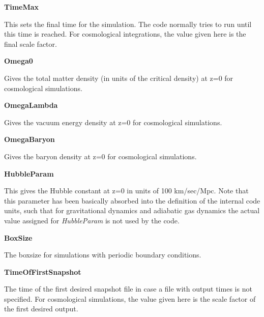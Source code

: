 \begin{DoxyItemize}
\item {\bfseries TimeMax} \par
 This sets the final time for the simulation. The code normally tries to run until this time is reached. For cosmological integrations, the value given here is the final scale factor.
\end{DoxyItemize}


\begin{DoxyItemize}
\item {\bfseries Omega0} \par
 Gives the total matter density (in units of the critical density) at z=0 for cosmological simulations.
\end{DoxyItemize}


\begin{DoxyItemize}
\item {\bfseries OmegaLambda} \par
 Gives the vacuum energy density at z=0 for cosmological simulations.
\end{DoxyItemize}


\begin{DoxyItemize}
\item {\bfseries OmegaBaryon} \par
 Gives the baryon density at z=0 for cosmological simulations.
\end{DoxyItemize}


\begin{DoxyItemize}
\item {\bfseries HubbleParam} \par
 This gives the Hubble constant at z=0 in units of 100 km/sec/Mpc. Note that this parameter has been basically absorbed into the definition of the internal code units, such that for gravitational dynamics and adiabatic gas dynamics the actual value assigned for {\itshape HubbleParam\/} is not used by the code.
\end{DoxyItemize}


\begin{DoxyItemize}
\item {\bfseries BoxSize} \par
 The boxsize for simulations with periodic boundary conditions.
\end{DoxyItemize}


\begin{DoxyItemize}
\item {\bfseries TimeOfFirstSnapshot} \par
 The time of the first desired snapshot file in case a file with output times is not specified. For cosmological simulations, the value given here is the scale factor of the first desired output.
\end{DoxyItemize}


